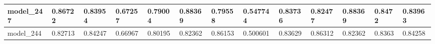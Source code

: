 \begin{tabular}{|l|l|l|l|l|l|l|l|l|l|l|l|l|}
model\_247     & 0.86722     & 0.83954        & 0.67257      & 0.79004          & 0.88369              & 0.79558              & 0.547744     & 0.83736           & 0.82477            & 0.88369         & 0.8472      & 0.83963      \\ \hline
model\_244     & 0.82713     & 0.84247        & 0.66967      & 0.80195          & 0.82362              & 0.86153              & 0.500601     & 0.83629           & 0.86312            & 0.82362         & 0.8363      & 0.84258      \\ \hline
\end{tabular}
